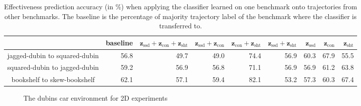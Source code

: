 \documentclass[letterpaper, 10 pt, conference]{ieeeconf}  %
\newcommand{\fssd}{\mbox{$\mathbf z_{\text{ssd}}$}}
\newcommand{\fcon}{\mbox{$\mathbf z_{\text{con}}$}}
\newcommand{\fsht}{\mbox{$\mathbf z_{\text{sht}}$}}
\begin{document}
\begin{table}[tbp]
\centering
\begin{tabular}{|c|r|r|r|r|r|r|r|r|}
\hline 
 & baseline & $\fssd+\fcon+\fsht$ & $\fssd+\fcon$ & $\fcon+\fsht$ & $\fssd+\fsht$ & $\fssd$ & $\fcon$ & $\fsht$ \\ \hline \hline
jagged-dubin to squared-dubin &  56.8 & 49.7 & 49.0 &	74.4 & 	56.9 & 	60.3	 & 67.9	& 55.5
 \\ \hline
squared-dubin to jagged-dubin & 59.2 & 56.9 &	56.8 &	71.1 & 	56.9 &	56.9 &	61.2 &	63.8 \\ \hline
bookshelf to skew-bookshelf & 62.1 & 57.1 &	59.4 &	82.1 & 	53.2 &	57.3 &	60.3 &	67.4 \\ \hline
\end{tabular}
\caption{Effectiveness prediction accuracy (in \%) when applying the classifier learned on one benchmark onto trajectories from other benchmarks. The baseline is the percentage of majority trajectory label of the benchmark where the classifier is transferred to.}
\label{tab:result2}
\end{table}



\begin{figure}[t]
\centering
{} \qquad
{} \qquad
{}
\caption{The dubins car environment for 2D experiments}
\label{fig:benchmarks1}
\end{figure}
\end{document}
